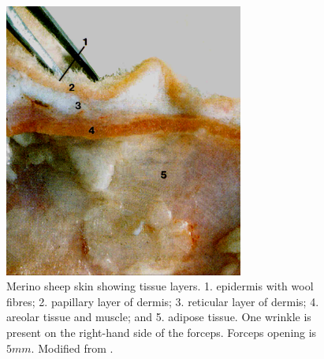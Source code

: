 %

\begin{figure}[!h]
  \centering
  \captionsetup{width=0.7\textwidth}
  \includegraphics[width=0.7\textwidth]{mitchell.png}
  \caption{Merino sheep skin showing tissue layers. 1. epidermis with wool fibres; 2. papillary layer of dermis; 3. reticular layer of dermis; 4. areolar tissue and muscle; and 5. adipose tissue. One wrinkle is present on the right-hand side of the forceps. Forceps opening is $5 mm$. Modified from \citep{mitchell-1984}.}
  \label{fig:mitchell}
\end{figure}

%

